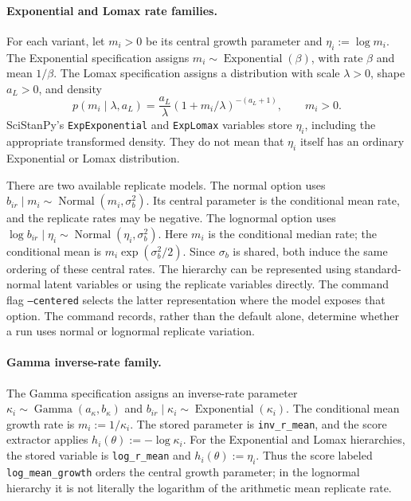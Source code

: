 \paragraph{Exponential and Lomax rate families.}
For each variant, let $m_i>0$ be its central growth parameter and
$\eta_i:=\log m_i$. The Exponential specification assigns
$m_i\sim\operatorname{Exponential}(\beta)$, with rate $\beta$ and mean
$1/\beta$. The Lomax specification assigns a distribution with scale
$\lambda>0$, shape $a_L>0$, and density
\[
p(m_i\mid\lambda,a_L)=\frac{a_L}{\lambda}
(1+m_i/\lambda)^{-(a_L+1)},\qquad m_i>0.
\]
SciStanPy's \texttt{ExpExponential} and \texttt{ExpLomax} variables store
$\eta_i$, including the appropriate transformed density. They do not mean
that $\eta_i$ itself has an ordinary Exponential or Lomax distribution.

There are two available replicate models. The normal option uses
$b_{ir}\mid m_i\sim\operatorname{Normal}(m_i,\sigma_b^2)$. Its central
parameter is the conditional mean rate, and the replicate rates may be
negative. The lognormal option uses
$\log b_{ir}\mid\eta_i\sim\operatorname{Normal}(\eta_i,\sigma_b^2)$.
Here $m_i$ is the conditional median rate; the conditional mean is
$m_i\exp(\sigma_b^2/2)$. Since $\sigma_b$ is shared, both induce the same
ordering of these central rates. The hierarchy can be represented using
standard-normal latent variables or using the replicate variables directly.
The command flag \texttt{--centered} selects the latter representation where
the model exposes that option. The command records, rather than the default
alone, determine whether a run uses normal or lognormal replicate variation.

\paragraph{Gamma inverse-rate family.}
The Gamma specification assigns an inverse-rate parameter
$\kappa_i\sim\operatorname{Gamma}(a_\kappa,b_\kappa)$ and
$b_{ir}\mid\kappa_i\sim\operatorname{Exponential}(\kappa_i)$.
The conditional mean growth rate is $m_i:=1/\kappa_i$. The stored
parameter is \texttt{inv\_r\_mean}, and the score extractor applies
$h_i(\theta):=-\log\kappa_i$. For the Exponential and Lomax hierarchies,
the stored variable is \texttt{log\_r\_mean} and
$h_i(\theta):=\eta_i$. Thus the score labeled \texttt{log\_mean\_growth}
orders the central growth parameter; in the lognormal hierarchy it is not
literally the logarithm of the arithmetic mean replicate rate.

